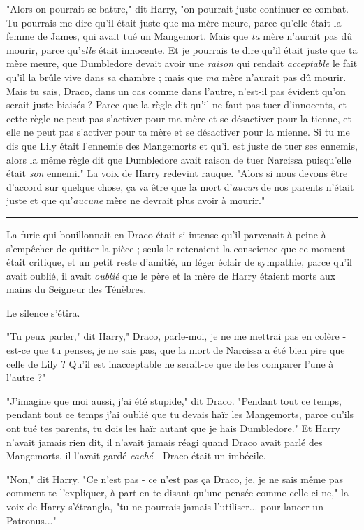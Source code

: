 "Alors on pourrait se battre," dit Harry, "on pourrait juste continuer ce combat. Tu pourrais me dire qu'il était juste que ma mère meure, parce qu'elle était la femme de James, qui avait tué un Mangemort. Mais que \emph{ta}  mère n'aurait pas dû mourir, parce qu'\emph{elle}  était innocente. Et je pourrais te dire qu'il était juste que ta mère meure, que Dumbledore devait avoir une \emph{raison}  qui rendait \emph{acceptable}  le fait qu'il la brûle vive dans sa chambre ; mais que \emph{ma}  mère n'aurait pas dû mourir. Mais tu sais, Draco, dans un cas comme dans l'autre, n'est-il pas évident qu'on serait juste biaisés ? Parce que la règle dit qu'il ne faut pas tuer d'innocents, et cette règle ne peut pas s'activer pour ma mère et se désactiver pour la tienne, et elle ne peut pas s'activer pour ta mère et se désactiver pour la mienne. Si tu me dis que Lily était l'ennemie des Mangemorts et qu'il est juste de tuer ses ennemis, alors la même règle dit que Dumbledore avait raison de tuer Narcissa puisqu'elle était \emph{son}  ennemi." La voix de Harry redevint rauque. "Alors si nous devons être d'accord sur quelque chose, ça va être que la mort d'\emph{aucun}  de nos parents n'était juste et que qu'\emph{aucune}  mère ne devrait plus avoir à mourir."
\par\noindent\rule{\textwidth}{0.4pt}
La furie qui bouillonnait en Draco était si intense qu'il parvenait à peine à s'empêcher de quitter la pièce ; seuls le retenaient la conscience que ce moment était critique, et un petit reste d'amitié, un léger éclair de sympathie, parce qu'il avait oublié, il avait \emph{oublié}  que le père et la mère de Harry étaient morts aux mains du Seigneur des Ténèbres.

Le silence s'étira.

"Tu peux parler," dit Harry," Draco, parle-moi, je ne me mettrai pas en colère - est-ce que tu penses, je ne sais pas, que la mort de Narcissa a été bien pire que celle de Lily ? Qu'il est inacceptable ne serait-ce que de les comparer l'une à l'autre ?"

"J'imagine que moi aussi, j'ai été stupide," dit Draco. "Pendant tout ce temps, pendant tout ce temps j'ai oublié que tu devais haïr les Mangemorts, parce qu'ils ont tué tes parents, tu dois les haïr autant que je hais Dumbledore." Et Harry n'avait jamais rien dit, il n'avait jamais réagi quand Draco avait parlé des Mangemorts, il l'avait gardé \emph{caché } - Draco était un imbécile.

"Non," dit Harry. "Ce n'est pas - ce n'est pas ça Draco, je, je ne sais même pas comment te l'expliquer, à part en te disant qu'une pensée comme celle-ci ne," la voix de Harry s'étrangla, "tu ne pourrais jamais l'utiliser... pour lancer un Patronus..."

